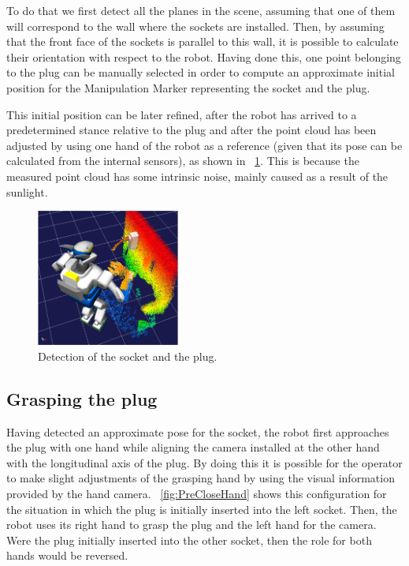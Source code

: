 		To do that we first detect all the planes in the scene, assuming that one of them will correspond
		to the wall where the sockets are installed.
		Then, by assuming that the front face of the sockets is parallel to this wall, it is possible
		to calculate their orientation with respect to the robot.
		Having done this, one point belonging to the plug can be manually selected in order to compute
		an approximate initial position for the Manipulation Marker representing the socket and the plug.
		
		This initial position can be later refined, after the robot has arrived to a predetermined stance
		relative to the plug and after the point cloud has been adjusted by using one hand of the robot as
		a reference (given that its pose can be calculated from the internal sensors), as shown in
		\figurename~\ref{fig:SocketPlugMarker}.
		This is because the measured point cloud has some intrinsic noise, mainly caused as a result of
		the sunlight.
		
		\begin{figure}[b]
			\centering
			\includegraphics[height = 4.5cm]{img/SocketPlugMarker}
			\caption{Detection of the socket and the plug.}
			\label{fig:SocketPlugMarker}
		\end{figure}
		
	\subsection{Grasping the plug}
		
		Having detected an approximate pose for the socket, the robot first approaches the plug
		with one hand while aligning the camera installed at the other hand with the longitudinal axis
		of the plug.
		By doing this it is possible for the operator to make slight adjustments of the grasping hand
		by using the visual information provided by the hand camera.
		\figurename~\ref{fig:PreCloseHand} shows this configuration for the situation in which the plug
		is initially inserted into the left socket.
		Then, the robot uses its right hand to grasp the plug and the left hand for the camera.
		Were the plug initially inserted into the other socket, then the role for both hands would be
		reversed.
		
